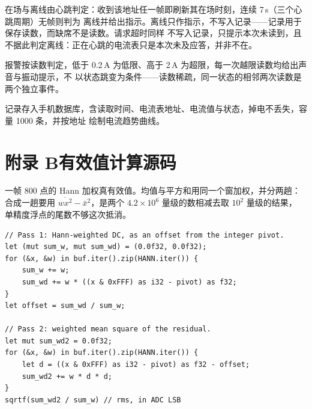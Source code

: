 \documentclass[12pt]{article}
\begin{document}
在场与离线由心跳判定：收到该地址任一帧即刷新其在场时刻，连续 7\,s（三个心跳周期）无帧则判为
离线并给出指示。离线只作指示，不写入记录——记录用于保存读数，而缺席不是读数。请求超时同样
不写入记录，只提示本次未读到，且不据此判定离线：正在心跳的电流表只是本次未及应答，并非不在。

报警按读数判定，低于 0.2\,A 为低限、高于 2\,A 为超限，每一次越限读数均给出声音与振动提示，不
以状态跳变为条件——读数稀疏，同一状态的相邻两次读数是两个独立事件。

记录存入手机数据库，含读取时间、电流表地址、电流值与状态，掉电不丢失，容量 1000 条，并按地址
绘制电流趋势曲线。


\appendix

\section{附录 B\quad 有效值计算源码}
一帧 800 点的 Hann 加权真有效值。均值与平方和用同一个窗加权，并分两趟：合成一趟要用
$\overline{wx^{2}}-\bar{x}^{2}$，是两个 $4.2\times10^{6}$ 量级的数相减去取 $10^{2}$ 量级的结果，
单精度浮点的尾数不够这次抵消。

\begin{lstlisting}[style=rust,caption={Hann 加权真有效值}]
// Pass 1: Hann-weighted DC, as an offset from the integer pivot.
let (mut sum_w, mut sum_wd) = (0.0f32, 0.0f32);
for (&x, &w) in buf.iter().zip(HANN.iter()) {
    sum_w += w;
    sum_wd += w * ((x & 0xFFF) as i32 - pivot) as f32;
}
let offset = sum_wd / sum_w;

// Pass 2: weighted mean square of the residual.
let mut sum_wd2 = 0.0f32;
for (&x, &w) in buf.iter().zip(HANN.iter()) {
    let d = ((x & 0xFFF) as i32 - pivot) as f32 - offset;
    sum_wd2 += w * d * d;
}
sqrtf(sum_wd2 / sum_w) // rms, in ADC LSB
\end{lstlisting}
\end{document}
